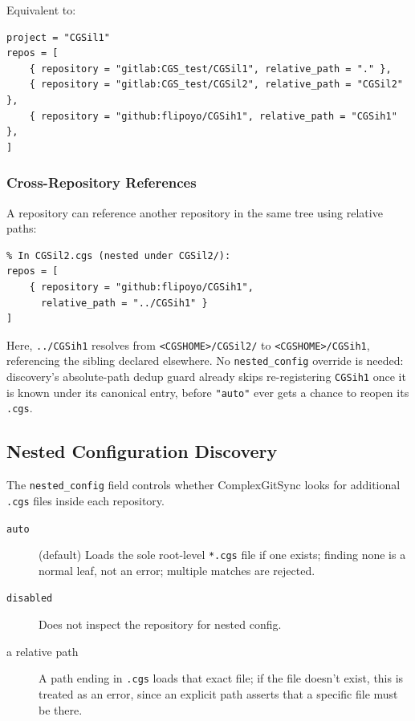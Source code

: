 Equivalent to:

\begin{lstlisting}
project = "CGSil1"
repos = [
    { repository = "gitlab:CGS_test/CGSil1", relative_path = "." },
    { repository = "gitlab:CGS_test/CGSil2", relative_path = "CGSil2" },
    { repository = "github:flipoyo/CGSih1", relative_path = "CGSih1" },
]
\end{lstlisting}

\subsubsection{Cross-Repository References}

A repository can reference another repository in the same tree using relative paths:

\begin{lstlisting}
% In CGSil2.cgs (nested under CGSil2/):
repos = [
    { repository = "github:flipoyo/CGSih1",
      relative_path = "../CGSih1" }
]
\end{lstlisting}

Here, \texttt{../CGSih1} resolves from \texttt{<CGSHOME>/CGSil2/} to
\texttt{<CGSHOME>/CGSih1}, referencing the sibling declared elsewhere. No
\texttt{nested\_config} override is needed: discovery's absolute-path dedup
guard already skips re-registering \texttt{CGSih1} once it is known under
its canonical entry, before \texttt{"auto"} ever gets a chance to reopen
its \texttt{.cgs}.

\subsection{Nested Configuration Discovery}
\label{subsec:cgs-nested}

The \texttt{nested\_config} field controls whether ComplexGitSync looks for
additional \texttt{.cgs} files inside each repository.

\begin{description}
  \item[\texttt{auto}] (default) Loads the sole root-level \texttt{*.cgs} file if
        one exists; finding none is a normal leaf, not an error; multiple
        matches are rejected.
  \item[\texttt{disabled}] Does not inspect the repository for nested config.
  \item[a relative path] A path ending in \texttt{.cgs} loads that exact file;
        if the file doesn't exist, this is treated as an error, since an
        explicit path asserts that a specific file must be there.
\end{description}


